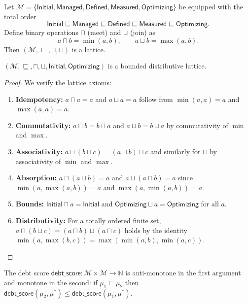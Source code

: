 \documentclass[11pt]{article}
\newcommand{\DebtScore}{\mathsf{debt\_score}}
\begin{document}
\begin{definition}\label{def:maturity-lattice}
Let $\mathcal{M} = \{\textsf{Initial}, \textsf{Managed},
\textsf{Defined}, \textsf{Measured}, \textsf{Optimizing}\}$ be
equipped with the total order
\[
  \textsf{Initial} \sqsubseteq \textsf{Managed} \sqsubseteq
  \textsf{Defined} \sqsubseteq \textsf{Measured} \sqsubseteq
  \textsf{Optimizing}.
\]
Define binary operations $\sqcap$ (meet) and $\sqcup$ (join) as
\[
  a \sqcap b = \min(a,b), \qquad a \sqcup b = \max(a,b).
\]
Then $(\mathcal{M}, \sqsubseteq, \sqcap, \sqcup)$ is a lattice.
\end{definition}

\begin{theorem}\label{thm:bounded-dist}
$(\mathcal{M}, \sqsubseteq, \sqcap, \sqcup, \textsf{Initial},
\textsf{Optimizing})$ is a bounded distributive lattice.
\end{theorem}

\begin{proof}
We verify the lattice axioms:
\begin{enumerate}[noitemsep]
  \item \textbf{Idempotency:} $a \sqcap a = a$ and $a \sqcup a = a$
        follow from $\min(a,a)=a$ and $\max(a,a)=a$.
  \item \textbf{Commutativity:} $a \sqcap b = b \sqcap a$ and
        $a \sqcup b = b \sqcup a$ by commutativity of $\min$ and
        $\max$.
  \item \textbf{Associativity:} $a \sqcap (b \sqcap c) =
        (a \sqcap b) \sqcap c$ and similarly for $\sqcup$ by
        associativity of $\min$ and $\max$.
  \item \textbf{Absorption:} $a \sqcap (a \sqcup b) = a$ and
        $a \sqcup (a \sqcap b) = a$ since $\min(a,\max(a,b))=a$
        and $\max(a,\min(a,b))=a$.
  \item \textbf{Bounds:} $\textsf{Initial} \sqcap a = \textsf{Initial}$
        and $\textsf{Optimizing} \sqcup a = \textsf{Optimizing}$ for
        all $a$.
  \item \textbf{Distributivity:} For a totally ordered finite set,
        $a \sqcap (b \sqcup c) = (a \sqcap b) \sqcup (a \sqcap c)$
        holds by the identity
        $\min(a,\max(b,c)) = \max(\min(a,b),\min(a,c))$.
\end{enumerate}
\end{proof}

\begin{corollary}\label{cor:lattice-hom}
The debt score $\DebtScore : \mathcal{M} \times \mathcal{M} \to
\mathbb{N}$ is anti-monotone in the first argument and monotone
in the second: if $\mu_1 \sqsubseteq \mu_2$ then
$\DebtScore(\mu_2, \mu^*) \leq \DebtScore(\mu_1, \mu^*)$.
\end{corollary}
\end{document}
